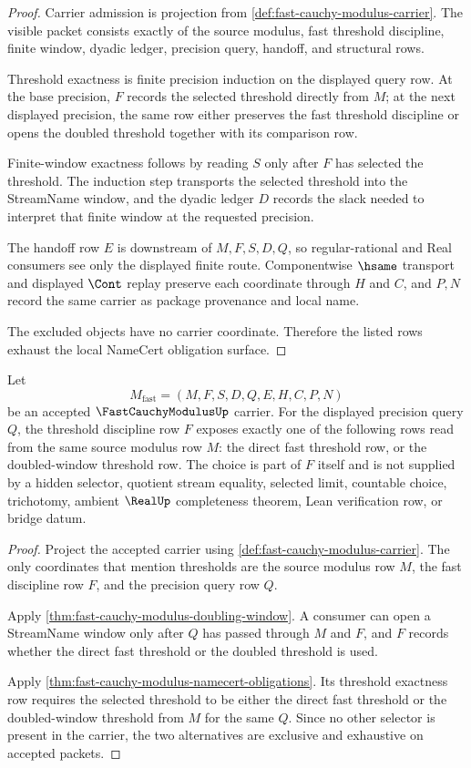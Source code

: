 \begin{proof}
Carrier admission is projection from \autoref{def:fast-cauchy-modulus-carrier}. The visible packet consists exactly of the source modulus, fast threshold discipline, finite window, dyadic ledger, precision query, handoff, and structural rows.

Threshold exactness is finite precision induction on the displayed query row. At the base precision, $F$ records the selected threshold directly from $M$; at the next displayed precision, the same row either preserves the fast threshold discipline or opens the doubled threshold together with its comparison row.

Finite-window exactness follows by reading $S$ only after $F$ has selected the threshold. The induction step transports the selected threshold into the StreamName window, and the dyadic ledger $D$ records the slack needed to interpret that finite window at the requested precision.

The handoff row $E$ is downstream of $M,F,S,D,Q$, so regular-rational and Real consumers see only the displayed finite route. Componentwise $\hsame$ transport and displayed $\Cont$ replay preserve each coordinate through $H$ and $C$, and $P,N$ record the same carrier as package provenance and local name.

The excluded objects have no carrier coordinate. Therefore the listed rows exhaust the local NameCert obligation surface.
\end{proof}

\begin{theorem}
\label{thm:fast-cauchy-modulus-threshold-dichotomy}
Let
$$
M_{\mathrm{fast}}=(M,F,S,D,Q,E,H,C,P,N)
$$
be an accepted $\FastCauchyModulusUp$ carrier. For the displayed precision query $Q$, the threshold discipline row $F$ exposes exactly one of the following rows read from the same source modulus row $M$: the direct fast threshold row, or the doubled-window threshold row. The choice is part of $F$ itself and is not supplied by a hidden selector, quotient stream equality, selected limit, countable choice, trichotomy, ambient $\RealUp$ completeness theorem, Lean verification row, or bridge datum.
\end{theorem}
\begin{proof}
Project the accepted carrier using \autoref{def:fast-cauchy-modulus-carrier}. The only coordinates that mention thresholds are the source modulus row $M$, the fast discipline row $F$, and the precision query row $Q$.

Apply \autoref{thm:fast-cauchy-modulus-doubling-window}. A consumer can open a StreamName window only after $Q$ has passed through $M$ and $F$, and $F$ records whether the direct fast threshold or the doubled threshold is used.

Apply \autoref{thm:fast-cauchy-modulus-namecert-obligations}. Its threshold exactness row requires the selected threshold to be either the direct fast threshold or the doubled-window threshold from $M$ for the same $Q$. Since no other selector is present in the carrier, the two alternatives are exclusive and exhaustive on accepted packets.
\end{proof}

